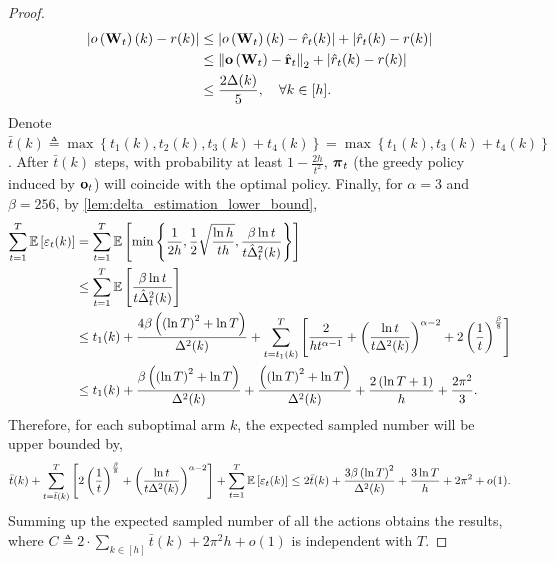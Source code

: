 \begin{proof}
	\begin{equation*}
	\begin{split}
	\left| o\left( {\mathbf{W}}_t \right)(k) - r(k) \right| &\le \left| o\left( {\mathbf{W}}_t \right)(k) - \hat{r}_t(k) \right| + \left| \hat{r}_t(k) - r(k) \right| \\
	&\le \left\| {\mathbf{o}}\left( {\mathbf{W}}_t \right) - \hat{{\mathbf{r}}}_t\right\|_2 + \left| \hat{r}_t(k) - r(k) \right| \\
	&\le \frac{2 \Delta(k)}{5}, \quad \forall k \in [h].
	\end{split}
	\end{equation*}
	Denote $\bar{t}(k) \triangleq \max\left\{ t_1(k), t_2(k), t_3(k) + t_4(k) \right\} = \max\left\{ t_1(k), t_3(k) + t_4(k) \right\} $. After $\bar{t}(k)$ steps, with probability at least $1 - \frac{2 h}{t^2}$, ${\boldsymbol{\pi}}_t$ (the greedy policy induced by ${\mathbf{o}}_t$) will coincide with the optimal policy. Finally, for $\alpha = 3$ and $\beta = 256$, by \cref{lem:delta_estimation_lower_bound},
	\begin{equation*}
	\begin{split}
	\sum\limits_{t=1}^{T}{ \operatorname*{{\mathbb{E}}}{ \left[ \varepsilon_t(k) \right]} } &= \sum\limits_{t=1}^{T}{ \operatorname*{{\mathbb{E}}}{ \left[ \min\left\{ \frac{1}{2 h}, \frac{1}{2} \sqrt{\frac{\ln{h}}{ t h}},  \frac{\beta \ln{t}}{t \hat{\Delta}_t^2(k)} \right\} \right]} } \\
	&\le \sum\limits_{t=1}^{T}{ \operatorname*{{\mathbb{E}}}{ \left[  \frac{\beta \ln{t}}{t \hat{\Delta}_t^2(k)} \right]} } \\
	&\le t_1(k) + \frac{ 4 \beta \left( \left( \ln{T}\right)^2 + \ln{T} \right)}{\Delta^2(k)} + \sum\limits_{t = t_1(k)}^{T}{ \left[ \frac{2}{ h t^{\alpha-1}} + \left( \frac{\ln{t}}{t \Delta^2(k)} \right)^{\alpha - 2} + 2 \left(\frac{1}{t}\right)^{\frac{\beta}{8}} \right] } \\
	&\le t_1(k) + \frac{\beta \left( \left( \ln{T}\right)^2 + \ln{T} \right)}{\Delta^2(k)} + \frac{ \left( \left( \ln{T}\right)^2 + \ln{T} \right)}{\Delta^2(k)} + \frac{2 \left( \ln{T} + 1\right)}{h} + \frac{2 \pi^2}{3}.
	\end{split}
	\end{equation*}
	Therefore, for each suboptimal arm $k$, the expected sampled number will be upper bounded by,
	\begin{equation*}
	\begin{split}
	\bar{t}(k) + \sum\limits_{t = \bar{t}(k) }^{T}{ \left[ 2 \left(\frac{1}{t}\right)^{\frac{\beta}{8}} + \left( \frac{\ln{t}}{t \Delta^2(k)} \right)^{\alpha - 2} \right] } + \sum\limits_{t=1}^{T}{ \operatorname*{{\mathbb{E}}}{ \left[ \varepsilon_t(k) \right]} } \le 2 \bar{t}(k) + \frac{ 3 \beta \left( \ln{T} \right)^2}{\Delta^2(k)} + \frac{3 \ln{T}}{h} + 2 \pi^2 + o(1).
	\end{split}
	\end{equation*}
Summing up the expected sampled number of all the actions obtains the results, where $C \triangleq 2 \cdot \sum\limits_{k \in [h]}{ \bar{t}(k)} + 2 \pi^2 h + o(1)$ is independent with $T$.
\end{proof}
